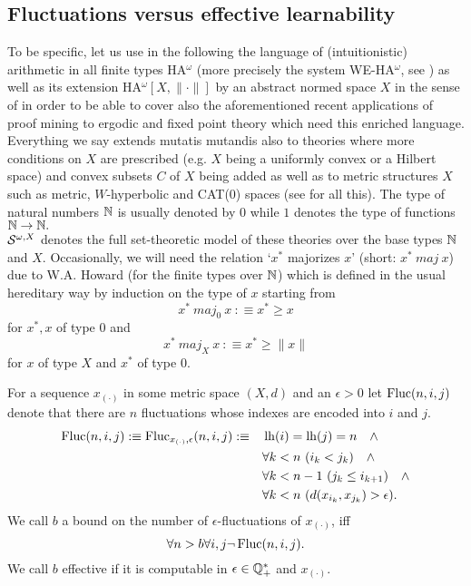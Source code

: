 \subsection{Fluctuations versus effective learnability}
To be specific, let us use in the following the language of (intuitionistic) 
arithmetic in all finite types HA$^{\omega}$ (more precisely the system 
WE-HA$^{\omega}$, see \cite{Kohlenbach08}) as well as its extension HA$^{\omega}[X,\|\cdot\|]$ 
by an abstract normed space $X$ in the sense of \cite{Kohlenbach05meta,GerKoh06,Kohlenbach08} in order to be able to cover also the aforementioned 
recent applications of proof mining to ergodic and fixed point theory which 
need this enriched language. Everything we say extends mutatis mutandis also 
to theories where more conditions on $X$ are prescribed (e.g. $X$ being 
a uniformly convex or a Hilbert space) and convex subsets $C$ of $X$ being 
added as well as to metric structures $X$ 
such as metric, $W$-hyperbolic and CAT(0) spaces (see \cite{Kohlenbach08} 
for all this). The type of natural numbers $\mathbb{N}$ is usually denoted by $0$ 
while $1$ denotes the type of functions $\mathbb{N}\to\mathbb{N}.$
\\[1mm] ${\cal S}^{\omega,X}$ denotes the full set-theoretic model of these 
theories over the base types $\mathbb{N}$ and $X.$ Occasionally, we will need 
the relation `$x^*$ majorizes $x$' (short: $x^* \ maj \ x$) due to W.A. Howard 
(for the finite types over $\mathbb{N}$)  
which is defined in the usual hereditary 
way by induction on the type of $x$ starting from 
\[ x^* \ maj_0 \ x\ :\equiv x^*\ge x \] for $x^*,x$ of type $0$ and 
\[ x^* \ maj_X \ x\ :\equiv x^* \ge \| x\|\] for $x$ of type $X$ and 
$x^*$ of type $0.$ 



\begin{dfn}
\label{d:nfluc}
For a sequence $x_{(\cdot)}$ in some metric space $(X,d)$ and an $\epsilon>0$
let $\operatorname{Fluc}(n,i,j)$ denote that there are $n$ fluctuations whose indexes are encoded into $i$ and $j$.
\begin{align*}
\operatorname{Fluc}(n,i,j):\equiv\operatorname{Fluc}_{x_{(\cdot)},\epsilon}(n,i,j):\equiv\quad &\operatorname{lh}(i)=\operatorname{lh}(j)=n\quad \wedge\\ 
&\forall k<n\ (i_k<j_k) \quad \wedge\\
&\forall k<n-1\ (j_k\leq i_{k+1}) \quad \wedge\\
&\forall k<n\ (d(x_{i_k},x_{j_k})>\epsilon).
\end{align*}
We call $b$ a bound on the number of $\epsilon$-fluctuations of $x_{(\cdot)}$, iff 
\[
\forall n>b \forall i,j \neg\operatorname{Fluc}(n,i,j).
\]
We call $b$ effective if it is computable in $\epsilon\in\mathbb{Q}^*_+$ and $x_{(\cdot)}$.
\end{dfn}



